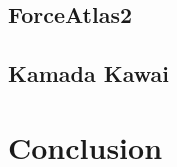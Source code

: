 \documentclass[11pt]{beamer}
\begin{document}
\begin{frame}{\subsecname}
    \resizebox{0.8\textwidth}{!}{}
\end{frame}

\subsection{ForceAtlas2}
\begin{frame}{\subsecname}


\end{frame}

\begin{frame}{\subsecname}
    \resizebox{0.8\textwidth}{!}{}
\end{frame}

\subsection{Kamada Kawai}
\begin{frame}{\subsecname}
\end{frame}

\begin{frame}{\subsecname}
    \resizebox{0.8\textwidth}{!}{}
\end{frame}

\section{Conclusion}

\end{document}

